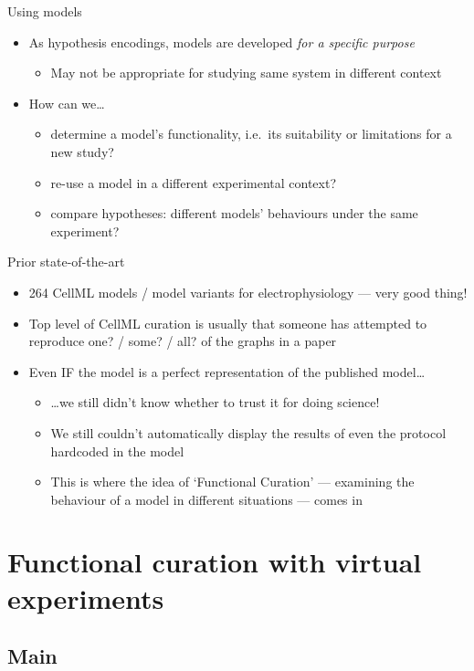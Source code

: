 \documentclass[t,xcolor={usenames,dvipsnames}]{beamer}
\newcommand{\subitem}[1]{\begin{itemize}[<.->]\item #1 \end{itemize}}
\begin{document}
\begin{frame}{Using models}
\begin{itemize}
\item As hypothesis encodings, models are developed \emph{for a specific purpose}
  \subitem{May not be appropriate for studying same system in different context}
\item How can we\ldots
  \begin{itemize}
  \item determine a model's functionality, i.e.\ its suitability or limitations for a new study?
  \item re-use a model in a different experimental context?
  \item compare hypotheses: different models' behaviours under the same experiment?
  \end{itemize}
\end{itemize}
\end{frame}


\begin{frame}{Prior state-of-the-art}
\begin{itemize}
\item 264 CellML models / model variants for electrophysiology --- very good thing!
\item Top level of CellML curation is usually that someone has attempted to reproduce one? / some? / all? of the graphs in a paper
\item Even IF the model is a perfect representation of the published model\ldots
  \begin{itemize}
  \item \ldots we still didn't know whether to trust it for doing science!
  \item We still couldn't automatically display the results of even the protocol hardcoded in the model %
  \item This is where the idea of `Functional Curation' --- examining the behaviour of a model in different situations --- comes in
  \end{itemize}
\end{itemize}
\end{frame}


\section{Functional curation with virtual experiments}
\subsection*{Main}
\end{document}
